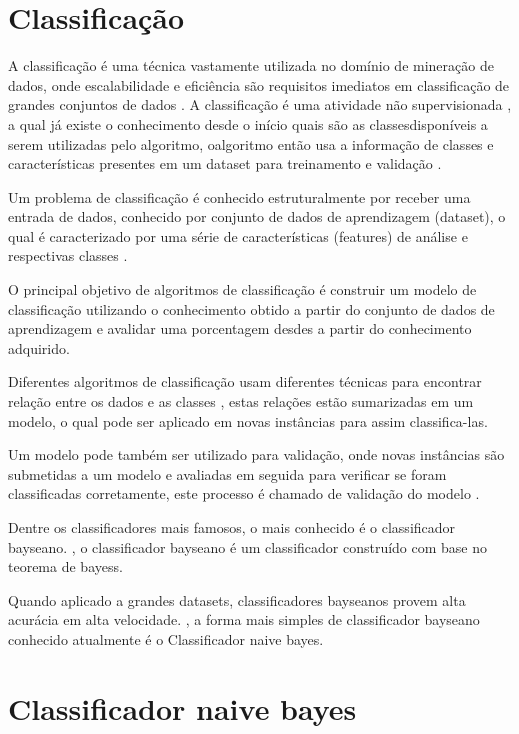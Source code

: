 \documentclass[
	12pt,				%
	oneside,			%
	a4paper,			%
	english,			%
	brazil				%
	]{abntex2ppgsi}
\begin{document}
\section{Classificação}
A classificação é uma técnica vastamente utilizada no domínio de mineração de dados, onde escalabilidade e eficiência são requisitos imediatos em classificação de grandes conjuntos de dados \cite{sharma2015}. A classificação é uma atividade não supervisionada \cite{ sharma2015},  a qual já existe o conhecimento desde o início quais são as classesdisponíveis a serem utilizadas pelo algoritmo, oalgoritmo então usa a informação de classes e características presentes em um dataset para treinamento e validação \cite{ sharma2015}.

Um problema de classificação é conhecido estruturalmente por receber uma entrada de dados, conhecido por conjunto de dados de aprendizagem (dataset), o qual é caracterizado por uma série de características (features) de análise e respectivas classes \cite{ Seth2016}. 

O principal objetivo de algoritmos de classificação é construir um modelo de classificação utilizando o conhecimento obtido a partir do conjunto de dados de aprendizagem e avalidar uma porcentagem desdes a partir do conhecimento adquirido. \cite{ Seth2016}

Diferentes algoritmos de classificação usam diferentes técnicas para encontrar relação entre os dados e as classes  \cite{ sharma2015}, estas relações estão sumarizadas em um modelo, o qual pode ser aplicado em novas instâncias para assim classifica-las.  \cite{ sharma2015}

Um modelo pode também ser utilizado para validação, onde novas instâncias são submetidas a um modelo e avaliadas em seguida para verificar se foram classificadas corretamente, este processo é chamado de validação do modelo  \cite{ sharma2015}.

Dentre os classificadores mais famosos, o mais conhecido é o classificador bayseano. \cite{ Seth2016}, o classificador bayseano é um classificador construído com base no teorema de bayess. \cite{ Seth2016}

Quando aplicado a grandes datasets, classificadores bayseanos provem alta acurácia em alta velocidade. \cite{ Seth2016}, a forma mais simples de classificador bayseano conhecido atualmente é o Classificador naive bayes. \cite{ Seth2016}

\section{Classificador naive bayes}
\end{document}
